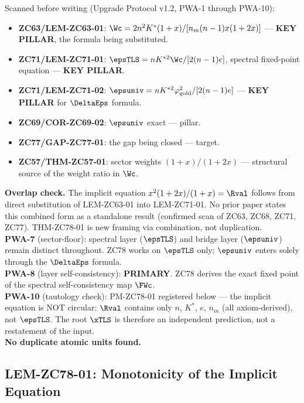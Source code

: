 \documentclass[12pt, a4paper]{article}
\begin{document}
\begin{formalbox}[title={Pre-Work Audit Record --- ZC78}]
Scanned before writing (Upgrade Protocol v1.2, PWA-1 through PWA-10):
\begin{itemize}[leftmargin=2em, noitemsep]
  \item \textbf{ZC63/LEM-ZC63-01}: $\Wc = 2n^2 K^*(1+x)/[n_m(n-1)x(1+2x)]$
    --- \textbf{KEY PILLAR}, the formula being substituted.
  \item \textbf{ZC71/LEM-ZC71-01}: $\epsTLS = n K^{*2}\Wc/[2(n-1)e]$,
    spectral fixed-point equation --- \textbf{KEY PILLAR}.
  \item \textbf{ZC71/LEM-ZC71-02}: $\epsuniv = n K^{*2}\varphi_{\rm gold}^2/[2(n-1)e]$
    --- \textbf{KEY PILLAR} for $\DeltaEps$ formula.
  \item \textbf{ZC69/COR-ZC69-02}: $\epsuniv$ exact --- pillar.
  \item \textbf{ZC77/GAP-ZC77-01}: the gap being closed --- target.
  \item \textbf{ZC57/THM-ZC57-01}: sector weights $(1+x)/(1+2x)$
    --- structural source of the weight ratio in $\Wc$.
\end{itemize}

\textbf{Overlap check.}
The implicit equation $x^2(1+2x)/(1+x) = \Rval$ follows from
direct substitution of LEM-ZC63-01 into LEM-ZC71-01.
No prior paper states this combined form as a standalone result
(confirmed scan of ZC63, ZC68, ZC71, ZC77).
THM-ZC78-01 is new framing via combination, not duplication.\\
\textbf{PWA-7} (sector-floor): spectral layer ($\epsTLS$) and bridge
layer ($\epsuniv$) remain distinct throughout. ZC78 works on
$\epsTLS$ only; $\epsuniv$ enters solely through the $\DeltaEps$
formula.\\
\textbf{PWA-8} (layer self-consistency): \textbf{PRIMARY}. ZC78
derives the exact fixed point of the spectral self-consistency
map $\FWc$.\\
\textbf{PWA-10} (tautology check): PM-ZC78-01 registered below ---
the implicit equation is NOT circular: $\Rval$ contains only
$n$, $K^*$, $e$, $n_m$ (all axiom-derived), not $\epsTLS$.
The root $\xTLS$ is therefore an independent prediction, not
a restatement of the input.\\
\textbf{No duplicate atomic units found.}
\end{formalbox}

\subsection{LEM-ZC78-01: Monotonicity of the Implicit Equation}
\label{sec:lem}
\end{document}
